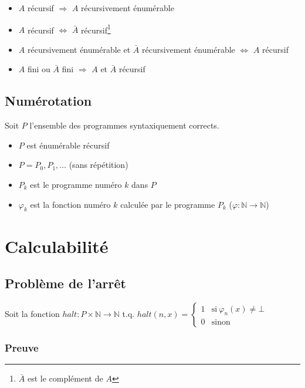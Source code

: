 \begin{itemize}
\item $A$ récursif $\Rightarrow$ $A$ récursivement énumérable
\item $A$ récursif $\Leftrightarrow$ $\bar{A}$ récursif\footnote{$\bar{A}$ est le complément de $A$}
\item $A$ récursivement énumérable et $\bar{A}$ récursivement énumérable $\Leftrightarrow$ $A$ récursif
\item $A$ fini ou $\bar{A}$ fini $\Rightarrow$ $A$ et $\bar{A}$ récursif
\end{itemize}

\subsection{Numérotation}

Soit $P$ l'ensemble des programmes syntaxiquement corrects.
\begin{itemize}
\item $P$ est énumérable récursif
\item $P = P_0, P_1, \ldots$ (sans répétition)
\item $P_k$ est le programme numéro $k$ dans $P$
\item $\varphi_k$ est la fonction numéro $k$ calculée par le programme $P_k$ ($\varphi : \mathbb{N} \rightarrow \mathbb{N}$)
\end{itemize}

\newpage
\section{Calculabilité}

\subsection{Problème de l'arrêt}

Soit la fonction $halt : P \times \mathbb{N} \rightarrow \mathbb{N}$ t.q. $halt(n,x) =
\begin{cases}
	1 & \text{si}\ \varphi_n(x) \neq \bot\\
	0 & \text{sinon}
\end{cases}$


\subsubsection{Preuve}

